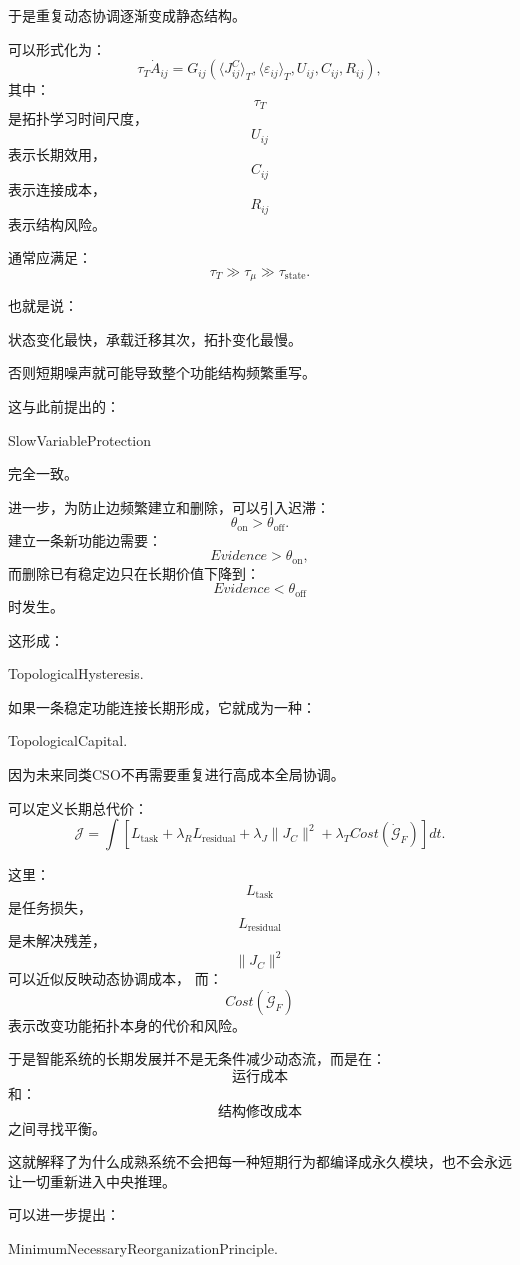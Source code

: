 于是重复动态协调逐渐变成静态结构。

可以形式化为：
\[
\tau_T
\dot A_{ij}
=
G_{ij}
\left(
\langle J^C_{ij}\rangle_T,
\langle\varepsilon_{ij}\rangle_T,
U_{ij},
C_{ij},
R_{ij}
\right),
\]
其中：
\[
\tau_T
\]
是拓扑学习时间尺度，
\[
U_{ij}
\]
表示长期效用，
\[
C_{ij}
\]
表示连接成本，
\[
R_{ij}
\]
表示结构风险。

通常应满足：
\[
\tau_T
\gg
\tau_{\mu}
\gg
\tau_{\text{state}}.
\]

也就是说：
\begin{statementbox}
状态变化最快，承载迁移其次，拓扑变化最慢。
\end{statementbox}

否则短期噪声就可能导致整个功能结构频繁重写。

这与此前提出的：
\begin{statementbox}
SlowVariableProtection
\end{statementbox}
完全一致。

进一步，为防止边频繁建立和删除，可以引入迟滞：
\[
\theta_{\text{on}}
>
\theta_{\text{off}}.
\]
建立一条新功能边需要：
\[
Evidence>\theta_{\text{on}},
\]
而删除已有稳定边只在长期价值下降到：
\[
Evidence<\theta_{\text{off}}
\]
时发生。

这形成：
\begin{statementbox}
TopologicalHysteresis.
\end{statementbox}

如果一条稳定功能连接长期形成，它就成为一种：
\begin{statementbox}
TopologicalCapital.
\end{statementbox}
因为未来同类CSO不再需要重复进行高成本全局协调。

可以定义长期总代价：
\[
\mathcal J
=
\int
\left[
L_{\text{task}}
+
\lambda_RL_{\text{residual}}
+
\lambda_J\|J_C\|^2
+
\lambda_TCost(\dot{\mathcal G}_F)
\right]dt.
\]

这里：
\[
L_{\text{task}}
\]
是任务损失，
\[
L_{\text{residual}}
\]
是未解决残差，
\[
\|J_C\|^2
\]
可以近似反映动态协调成本，
而：
\[
Cost(\dot{\mathcal G}_F)
\]
表示改变功能拓扑本身的代价和风险。

于是智能系统的长期发展并不是无条件减少动态流，而是在：
\[
\text{运行成本}
\]
和：
\[
\text{结构修改成本}
\]
之间寻找平衡。

这就解释了为什么成熟系统不会把每一种短期行为都编译成永久模块，也不会永远让一切重新进入中央推理。

可以进一步提出：
\begin{statementbox}
MinimumNecessaryReorganizationPrinciple.
\end{statementbox}

